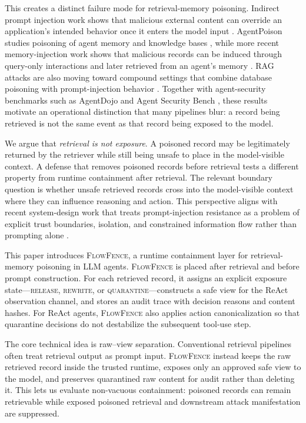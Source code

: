 \documentclass[11pt]{article}
\newcommand{\ff}{\textsc{FlowFence}\xspace}
\begin{document}
This creates a distinct failure mode for retrieval-memory poisoning. Indirect prompt injection work shows that malicious external content can override an application's intended behavior once it enters the model input \citep{greshake2023indirect}. AgentPoison studies poisoning of agent memory and knowledge bases \citep{agentpoison}, while more recent memory-injection work shows that malicious records can be induced through query-only interactions and later retrieved from an agent's memory \citep{dong2025minja}. RAG attacks are also moving toward compound settings that combine database poisoning with prompt-injection behavior \citep{wang2026pidp}. Together with agent-security benchmarks such as AgentDojo and Agent Security Bench \citep{agentdojo,asb}, these results motivate an operational distinction that many pipelines blur: a record being retrieved is not the same event as that record being exposed to the model.

We argue that \emph{retrieval is not exposure}. A poisoned record may be legitimately returned by the retriever while still being unsafe to place in the model-visible context. A defense that removes poisoned records before retrieval tests a different property from runtime containment after retrieval. The relevant boundary question is whether unsafe retrieved records cross into the model-visible context where they can influence reasoning and action. This perspective aligns with recent system-design work that treats prompt-injection resistance as a problem of explicit trust boundaries, isolation, and constrained information flow rather than prompting alone \citep{beurerkellner2025designpatterns}.

This paper introduces \ff, a runtime containment layer for retrieval-memory poisoning in LLM agents. \ff is placed after retrieval and before prompt construction. For each retrieved record, it assigns an explicit exposure state---\textsc{release}, \textsc{rewrite}, or \textsc{quarantine}---constructs a safe view for the ReAct observation channel, and stores an audit trace with decision reasons and content hashes. For ReAct agents, \ff also applies action canonicalization so that quarantine decisions do not destabilize the subsequent tool-use step.

The core technical idea is raw--view separation. Conventional retrieval pipelines often treat retrieval output as prompt input. \ff instead keeps the raw retrieved record inside the trusted runtime, exposes only an approved safe view to the model, and preserves quarantined raw content for audit rather than deleting it. This lets us evaluate non-vacuous containment: poisoned records can remain retrievable while exposed poisoned retrieval and downstream attack manifestation are suppressed.
\end{document}
